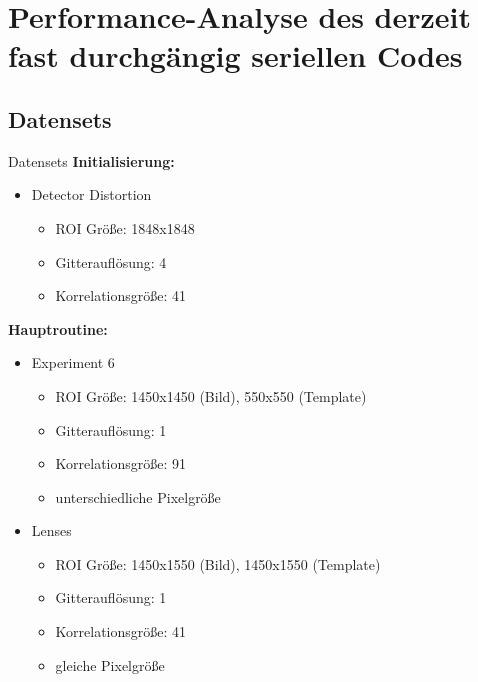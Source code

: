 
\section{Performance-Analyse des derzeit fast durchgängig seriellen Codes}

\subsection{Datensets}
\begin{frame}{Datensets}
\textbf{Initialisierung:}
\begin{itemize}
	\item<2-> Detector Distortion
	\begin{itemize}
		\item ROI Größe: 1848x1848
		\item Gitterauflösung: 4
		\item Korrelationsgröße: 41
	\end{itemize}
\end{itemize}
\textbf{Hauptroutine:}
\begin{itemize}
	\item<3-> Experiment 6
	\begin{itemize}
		\item ROI Größe: 1450x1450 (Bild), 550x550 (Template)
		\item Gitterauflösung: 1
		\item Korrelationsgröße: 91
		\item unterschiedliche Pixelgröße
	\end{itemize}
	\item<4-> Lenses
	\begin{itemize}
		\item ROI Größe: 1450x1550 (Bild), 1450x1550 (Template)
		\item Gitterauflösung: 1
		\item Korrelationsgröße: 41
		\item gleiche Pixelgröße
	\end{itemize}
\end{itemize}
\end{frame}

